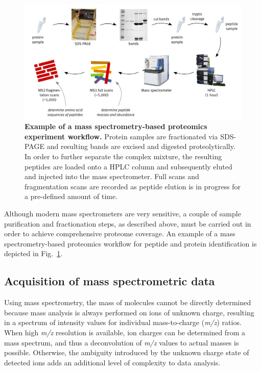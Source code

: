 \begin{figure}
\includegraphics[width=\textwidth]{figures/Proteomics.jpg}
\caption{
{\bf Example of a mass spectrometry-based proteomics experiment workflow.} 
Protein samples are fractionated via SDS-PAGE and resulting bands are excised and
digested proteolytically. In order to further separate the complex mixture, 
the resulting peptides are loaded onto a HPLC column and subsequently eluted 
and injected into the mass spectrometer. Full scans and fragmentation scans
are recorded as peptide elution is in progress for a pre-defined amount of time.
}
\label{fig:proteomics-overview}
\end{figure}

Although modern mass spectrometers are very sensitive, a couple of sample 
purification and fractionation steps, as described above, must be carried out 
in order to achieve comprehensive proteome coverage. 
An example of a mass spectrometry-based proteomics workflow for peptide 
and protein identification is depicted in Fig.~\ref{fig:proteomics-overview}.



\subsection{Acquisition of mass spectrometric data}

Using mass spectrometry, the mass of molecules cannot be directly determined
because mass analysis is always performed on ions of unknown charge, resulting
in a spectrum of intensity values for individual mass-to-charge ({\em m/z}) 
ratios.
When high {\em m/z} resolution is available, ion charges can be determined 
from a mass spectrum, and thus a deconvolution of {\em m/z} values to actual 
masses is possible.
Otherwise, the ambiguity introduced by the unknown charge state of detected
ions adds an additional level of complexity to data analysis.

